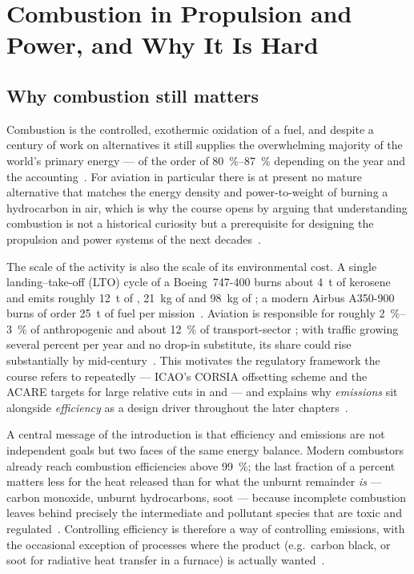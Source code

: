 \chapter{Combustion in Propulsion and Power, and Why It Is Hard}\label{ch:intro}

\section{Why combustion still matters}

Combustion is the controlled, exothermic oxidation of a fuel, and despite a century of work on alternatives it still supplies the overwhelming majority of the world's primary energy --- of the order of \SI{80}{\percent}--\SI{87}{\percent} depending on the year and the accounting~\cite{lecture1}. For aviation in particular there is at present no mature alternative that matches the energy density and power-to-weight of burning a hydrocarbon in air, which is why the course opens by arguing that understanding combustion is not a historical curiosity but a prerequisite for designing the propulsion and power systems of the next decades~\cite{lecture1,Langella_LectureNotes}.

The scale of the activity is also the scale of its environmental cost. A single landing--take-off (LTO) cycle of a Boeing~747-400 burns about \SI{4}{\tonne} of kerosene and emits roughly \SI{12}{\tonne} of , \SI{21}{kg} of  and \SI{98}{kg} of ; a modern Airbus A350-900 burns of order \SI{25}{\tonne} of fuel per mission~\cite{lecture1}. Aviation is responsible for roughly \SI{2}{\percent}--\SI{3}{\percent} of anthropogenic  and about \SI{12}{\percent} of transport-sector ; with traffic growing several percent per year and no drop-in substitute, its share could rise substantially by mid-century~\cite{lecture1}. This motivates the regulatory framework the course refers to repeatedly --- ICAO's CORSIA offsetting scheme and the ACARE targets for large relative cuts in  and  --- and explains why \emph{emissions} sit alongside \emph{efficiency} as a design driver throughout the later chapters~\cite{lecture1}.

A central message of the introduction is that efficiency and emissions are not independent goals but two faces of the same energy balance. Modern combustors already reach combustion efficiencies above \SI{99}{\percent}; the last fraction of a percent matters less for the heat released than for what the unburnt remainder \emph{is} --- carbon monoxide, unburnt hydrocarbons, soot --- because incomplete combustion leaves behind precisely the intermediate and pollutant species that are toxic and regulated~\cite{lecture1}. Controlling efficiency is therefore a way of controlling emissions, with the occasional exception of processes where the product (e.g.\ carbon black, or soot for radiative heat transfer in a furnace) is actually wanted~\cite{lecture1}.

